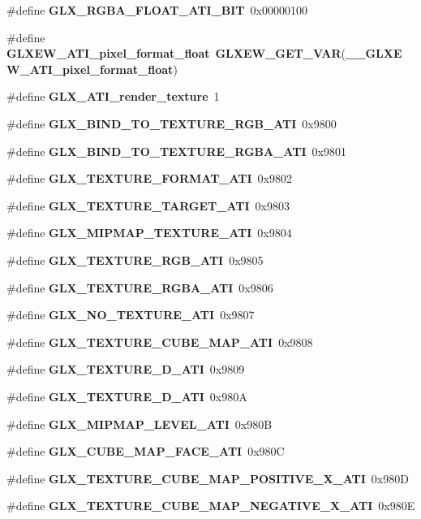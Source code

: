 \begin{DoxyCompactItemize}
\#define {\bf G\+L\+X\+\_\+\+R\+G\+B\+A\+\_\+\+F\+L\+O\+A\+T\+\_\+\+A\+T\+I\+\_\+\+B\+IT}~0x00000100
\item 
\#define {\bf G\+L\+X\+E\+W\+\_\+\+A\+T\+I\+\_\+pixel\+\_\+format\+\_\+float}~{\bf G\+L\+X\+E\+W\+\_\+\+G\+E\+T\+\_\+\+V\+AR}({\bf \+\_\+\+\_\+\+G\+L\+X\+E\+W\+\_\+\+A\+T\+I\+\_\+pixel\+\_\+format\+\_\+float})
\item 
\#define {\bf G\+L\+X\+\_\+\+A\+T\+I\+\_\+render\+\_\+texture}~1
\item 
\#define {\bf G\+L\+X\+\_\+\+B\+I\+N\+D\+\_\+\+T\+O\+\_\+\+T\+E\+X\+T\+U\+R\+E\+\_\+\+R\+G\+B\+\_\+\+A\+TI}~0x9800
\item 
\#define {\bf G\+L\+X\+\_\+\+B\+I\+N\+D\+\_\+\+T\+O\+\_\+\+T\+E\+X\+T\+U\+R\+E\+\_\+\+R\+G\+B\+A\+\_\+\+A\+TI}~0x9801
\item 
\#define {\bf G\+L\+X\+\_\+\+T\+E\+X\+T\+U\+R\+E\+\_\+\+F\+O\+R\+M\+A\+T\+\_\+\+A\+TI}~0x9802
\item 
\#define {\bf G\+L\+X\+\_\+\+T\+E\+X\+T\+U\+R\+E\+\_\+\+T\+A\+R\+G\+E\+T\+\_\+\+A\+TI}~0x9803
\item 
\#define {\bf G\+L\+X\+\_\+\+M\+I\+P\+M\+A\+P\+\_\+\+T\+E\+X\+T\+U\+R\+E\+\_\+\+A\+TI}~0x9804
\item 
\#define {\bf G\+L\+X\+\_\+\+T\+E\+X\+T\+U\+R\+E\+\_\+\+R\+G\+B\+\_\+\+A\+TI}~0x9805
\item 
\#define {\bf G\+L\+X\+\_\+\+T\+E\+X\+T\+U\+R\+E\+\_\+\+R\+G\+B\+A\+\_\+\+A\+TI}~0x9806
\item 
\#define {\bf G\+L\+X\+\_\+\+N\+O\+\_\+\+T\+E\+X\+T\+U\+R\+E\+\_\+\+A\+TI}~0x9807
\item 
\#define {\bf G\+L\+X\+\_\+\+T\+E\+X\+T\+U\+R\+E\+\_\+\+C\+U\+B\+E\+\_\+\+M\+A\+P\+\_\+\+A\+TI}~0x9808
\item 
\#define {\bf G\+L\+X\+\_\+\+T\+E\+X\+T\+U\+R\+E\+\_\+D\+\_\+\+A\+TI}~0x9809
\item 
\#define {\bf G\+L\+X\+\_\+\+T\+E\+X\+T\+U\+R\+E\+\_\+D\+\_\+\+A\+TI}~0x980A
\item 
\#define {\bf G\+L\+X\+\_\+\+M\+I\+P\+M\+A\+P\+\_\+\+L\+E\+V\+E\+L\+\_\+\+A\+TI}~0x980B
\item 
\#define {\bf G\+L\+X\+\_\+\+C\+U\+B\+E\+\_\+\+M\+A\+P\+\_\+\+F\+A\+C\+E\+\_\+\+A\+TI}~0x980C
\item 
\#define {\bf G\+L\+X\+\_\+\+T\+E\+X\+T\+U\+R\+E\+\_\+\+C\+U\+B\+E\+\_\+\+M\+A\+P\+\_\+\+P\+O\+S\+I\+T\+I\+V\+E\+\_\+\+X\+\_\+\+A\+TI}~0x980D
\item 
\#define {\bf G\+L\+X\+\_\+\+T\+E\+X\+T\+U\+R\+E\+\_\+\+C\+U\+B\+E\+\_\+\+M\+A\+P\+\_\+\+N\+E\+G\+A\+T\+I\+V\+E\+\_\+\+X\+\_\+\+A\+TI}~0x980E

\end{DoxyCompactItemize}
